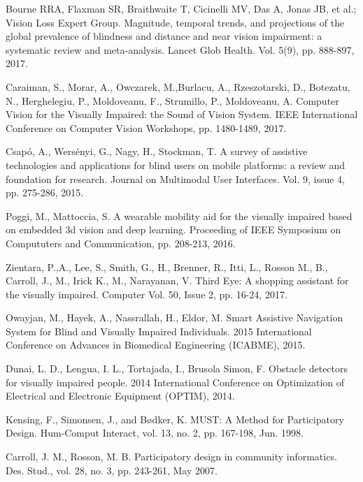 \documentclass[10pt,conference,compsocconf]{IEEEtran}
\begin{document}

%


\begin{thebibliography}{99}

 Bourne RRA, Flaxman SR, Braithwaite T, Cicinelli MV, Das A, Jonas JB, et al.; Vision Loss Expert Group. Magnitude, temporal trends, and projections of the global prevalence of blindness and distance and near vision impairment: a systematic review and meta-analysis. Lancet Glob Health. Vol. 5(9), pp. 888-897, 2017.


 Caraiman, S., Morar, A., Owczarek, M.,Burlacu, A., Rzeszotarski, D., Botezatu, N., Herghelegiu, P., Moldoveanu, F., Strumillo, P., Moldoveanu, A. Computer Vision for the Visually Impaired: the Sound of Vision System. IEEE International Conference on Computer Vision Workshops, pp. 1480-1489, 2017.

 Csap\'{o}, A., Wers\'{e}nyi, G., Nagy, H., Stockman, T. A survey of assistive technologies and applications for blind users on mobile platforms: a review and foundation for research. Journal on Multimodal User Interfaces. Vol. 9, issue 4,  pp. 275-286, 2015.


 Poggi, M., Mattoccia, S. A wearable mobility aid for the visually impaired based on embedded 3d vision and deep learning. Proceeding of IEEE Symposium on Compututers and Communication, pp. 208-213, 2016.

 Zientara, P.,A., Lee, S., Smith, G., H., Brenner, R., Itti, L., Rosson M., B., Carroll, J., M., Irick K., M., Narayanan, V. Third Eye: A shopping assistant for the visually impaired. Computer Vol. 50, Issue 2, pp. 16-24, 2017.


 Owayjan, M., Hayek, A., Nassrallah, H., Eldor, M. Smart Assistive Navigation System for Blind and Visually Impaired Individuals. 2015 International Conference on Advances in Biomedical Engineering (ICABME), 2015.

 Dunai, L. D., Lengua, I. L., Tortajada, I., Brusola Simon, F. Obstacle detectors for visually impaired people. 2014 International Conference on Optimization of Electrical and Electronic Equipment (OPTIM), 2014.

 Kensing, F., Simonsen, J., and B\o dker, K. MUST: A Method for Participatory Design. Hum-Comput Interact, vol. 13, no. 2, pp. 167-198, Jun. 1998.


 \noindent Carroll, J. M., Rosson, M. B. Participatory design in community informatics. Des. Stud., vol. 28, no. 3, pp. 243-261, May 2007.


\end{thebibliography}
\end{document}

